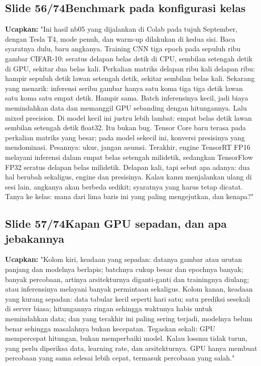 \documentclass[11pt]{article}
\renewcommand{\framebox}[1]{\colorbox{acc!15}{\textcolor{acc}{\textbf{#1}}}}
\begin{document}
\subsection*{\framebox{Slide 56/74}\quad Benchmark pada konfigurasi kelas}
\textbf{Ucapkan:} "Ini hasil nb05 yang dijalankan di Colab pada tujuh September, dengan Tesla T4, mode penuh, dan warm-up dilakukan di kedua sisi. Baca syaratnya dulu, baru angkanya. Training CNN tiga epoch pada sepuluh ribu gambar CIFAR-10: seratus delapan belas detik di CPU, sembilan setengah detik di GPU, sekitar dua belas kali. Perkalian matriks delapan ribu kali delapan ribu: hampir sepuluh detik lawan setengah detik, sekitar sembilan belas kali. Sekarang yang menarik: inferensi seribu gambar hanya satu koma tiga tiga detik lawan satu koma satu empat detik. Hampir sama. Batch inferensinya kecil, jadi biaya memindahkan data dan memanggil GPU sebanding dengan hitungannya. Lalu mixed precision. Di model kecil ini justru lebih lambat: empat belas detik lawan sembilan setengah detik float32. Itu bukan bug. Tensor Core baru terasa pada perkalian matriks yang besar; pada model sekecil ini, konversi presisinya yang mendominasi. Pesannya: ukur, jangan asumsi. Terakhir, engine TensorRT FP16 melayani inferensi dalam empat belas setengah milidetik, sedangkan TensorFlow FP32 seratus delapan belas milidetik. Delapan kali, tapi sebut apa adanya: dua hal berubah sekaligus, engine dan presisinya. Kalau kamu menjalankan ulang di sesi lain, angkanya akan berbeda sedikit; syaratnya yang harus tetap dicatat. Tanya ke kelas: mana dari lima baris ini yang paling mengejutkan, dan kenapa?"\\[2pt]

\subsection*{\framebox{Slide 57/74}\quad Kapan GPU sepadan, dan apa jebakannya}
\textbf{Ucapkan:} "Kolom kiri, keadaan yang sepadan: datanya gambar atau urutan panjang dan modelnya berlapis; batchnya cukup besar dan epochnya banyak; banyak percobaan, artinya arsitekturnya diganti-ganti dan trainingnya diulang; atau inferensinya melayani banyak permintaan sekaligus. Kolom kanan, keadaan yang kurang sepadan: data tabular kecil seperti hari satu; satu prediksi sesekali di server biasa; hitungannya ringan sehingga waktunya habis untuk memindahkan data; dan yang terakhir ini paling sering terjadi, modelnya belum benar sehingga masalahnya bukan kecepatan. Tegaskan sekali: GPU mempercepat hitungan, bukan memperbaiki model. Kalau lossmu tidak turun, yang perlu diperiksa data, learning rate, dan arsitekturnya. GPU hanya membuat percobaan yang sama selesai lebih cepat, termasuk percobaan yang salah."\\[2pt]
\end{document}
